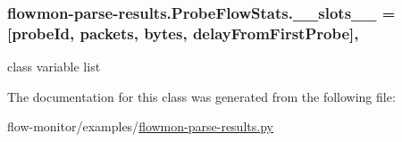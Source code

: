 \subsubsection[{\texorpdfstring{\+\_\+\+\_\+slots\+\_\+\+\_\+}{__slots__}}]{\setlength{\rightskip}{0pt plus 5cm}flowmon-\/parse-\/results.\+Probe\+Flow\+Stats.\+\_\+\+\_\+slots\+\_\+\+\_\+ = \mbox{[}\textquotesingle{}probe\+Id\textquotesingle{}, \textquotesingle{}packets\textquotesingle{}, \textquotesingle{}bytes\textquotesingle{}, \textquotesingle{}delay\+From\+First\+Probe\textquotesingle{}\mbox{]}\hspace{0.3cm}{\ttfamily [static]}, {\ttfamily [private]}}\hypertarget{classflowmon-parse-results_1_1ProbeFlowStats_a14e908486c3e1a8bb897432e42b0670b}{}\label{classflowmon-parse-results_1_1ProbeFlowStats_a14e908486c3e1a8bb897432e42b0670b}


class variable list 



The documentation for this class was generated from the following file\+:\begin{DoxyCompactItemize}
\item 
flow-\/monitor/examples/\hyperlink{flowmon-parse-results_8py}{flowmon-\/parse-\/results.\+py}\end{DoxyCompactItemize}
